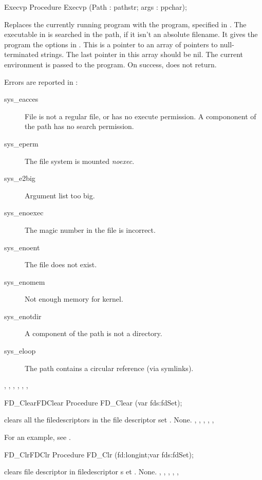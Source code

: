 \begin{procedure}{Execvp}
\Declaration
Procedure Execvp (Path : pathstr; args : ppchar);

\Description

Replaces the currently running program with the program, specified in
. The executable in  is searched in the path, if it isn't
an absolute filename.
It gives the program the options in . This is a pointer to an array of pointers to null-terminated
strings. The last pointer in this array should be nil.
The current environment is passed to the program.
On success,  does not return.

\Errors
Errors are reported in :
\begin{description}
\item[sys\_eacces] File is not a regular file, or has no execute permission.
A compononent of the path has no search permission.
\item[sys\_eperm] The file system is mounted \textit{noexec}.
\item[sys\_e2big] Argument list too big.
\item[sys\_enoexec] The magic number in the file is incorrect.
\item[sys\_enoent] The file does not exist.
\item[sys\_enomem] Not enough memory for kernel.
\item[sys\_enotdir] A component of the path is not a directory.
\item[sys\_eloop] The path contains a circular reference (via symlinks).
\end{description}
\SeeAlso
{}, , ,
, , ,  
\end{procedure}
\html{}
\begin{procedurel}{FD\_Clear}{FDClear}
\Declaration
Procedure FD\_Clear (var fds:fdSet);

\Description
{} clears all the filedescriptors in the file descriptor 
set .
\Errors
None.
\SeeAlso
{}, 
, 
, 
,
, 

\end{procedurel}
For an example, see .
\begin{procedurel}{FD\_Clr}{FDClr}
\Declaration
Procedure FD\_Clr (fd:longint;var fds:fdSet);

\Description
  clears file descriptor  in filedescriptor s
  et .
\Errors
None.
\SeeAlso
{}, 
, 
,
, 
, 
\end{procedurel}
